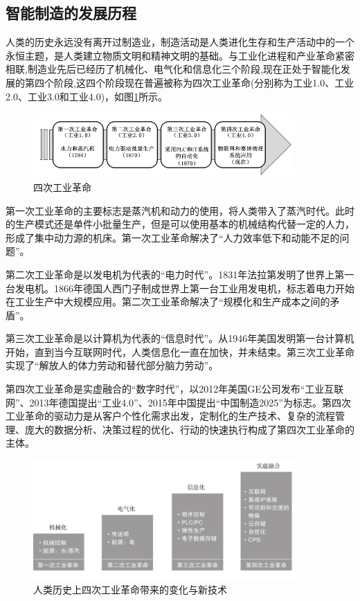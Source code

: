 \documentclass[lang=cn,12pt,bibtex,newtx,twoside,margintrue,citestyle=gb7714-2015, bibstyle=gb7714-2015]{elegantbook}
\begin{document}
\subsection{智能制造的发展历程}
\label{sec:org97670eb}
人类的历史永远没有离开过制造业，制造活动是人类进化生存和生产活动中的一个永恒主题，是人类建立物质文明和精神文明的基础。与工业化进程和产业革命紧密相联,制造业先后已经历了机械化、电气化和信息化三个阶段,现在正处于智能化发展的第四个阶段,这四个阶段现在普遍被称为四次工业革命(分别称为工业1.0、工业2.0、工业3.0和工业4.0)，如图\ref{1.1}所示。

\begin{figure}[htbp]
\centering
\includegraphics[angle=0,width=10cm]{./figure/1.1.png}
\caption{\label{1.1}四次工业革命}
\end{figure}

第一次工业革命的主要标志是蒸汽机和动力的使用，将人类带入了蒸汽时代。此时的生产模式还是单件小批量生产，但是可以使用基本的机械结构代替一定的人力，形成了集中动力源的机床。第一次工业革命解决了“人力效率低下和动能不足的问题”。

第二次工业革命是以发电机为代表的“电力时代”。1831年法拉第发明了世界上第一台发电机。1866年德国人西门子制成世界上第一台工业用发电机，标志着电力开始在工业生产中大规模应用。第二次工业革命解决了“规模化和生产成本之间的矛盾”。

第三次工业革命是以计算机为代表的“信息时代”。从1946年美国发明第一台计算机开始，直到当今互联网时代，人类信息化一直在加快，并未结束。第三次工业革命实现了“解放人的体力劳动和替代部分脑力劳动”。

第四次工业革命是实虚融合的“数字时代”，以2012年美国GE公司发布“工业互联网”、2013年德国提出“工业4.0”、2015年中国提出“中国制造2025”为标志。第四次工业革命的驱动力是从客户个性化需求出发，定制化的生产技术、复杂的流程管理、庞大的数据分析、决策过程的优化、行动的快速执行构成了第四次工业革命的主体。

\begin{figure}[htbp]
\centering
\includegraphics[angle=0,width=10cm]{./figure/1.2.png}
\caption{\label{1.2}人类历史上四次工业革命带来的变化与新技术}
\end{figure}
\end{document}
